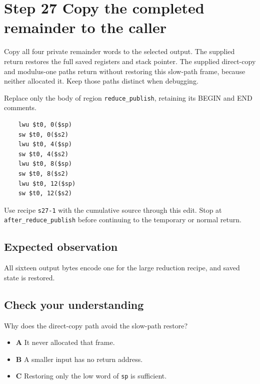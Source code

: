 \section{Step 27 Copy the completed remainder to the caller}\label{rsa-s27}

Copy all four private remainder words to the selected output. The supplied return restores the full saved registers and stack pointer. The supplied direct-copy and modulus-one paths return without restoring this slow-path frame, because neither allocated it. Keep those paths distinct when debugging.

Replace only the body of region \texttt{reduce\_publish}, retaining its BEGIN and END comments.

\begin{verbatim}
    lwu $t0, 0($sp)
    sw $t0, 0($s2)
    lwu $t0, 4($sp)
    sw $t0, 4($s2)
    lwu $t0, 8($sp)
    sw $t0, 8($s2)
    lwu $t0, 12($sp)
    sw $t0, 12($s2)
\end{verbatim}

Use recipe \texttt{s27-1} with the cumulative source through this edit. Stop at \texttt{after\_reduce\_publish} before continuing to the temporary or normal return.

\subsection{Expected observation}
All sixteen output bytes encode one for the large reduction recipe, and saved state is restored.

\subsection{Check your understanding}
Why does the direct-copy path avoid the slow-path restore?

\begin{itemize}
  \item \textbf{A} It never allocated that frame.
  \item \textbf{B} A smaller input has no return address.
  \item \textbf{C} Restoring only the low word of \texttt{sp} is sufficient.
\end{itemize}
